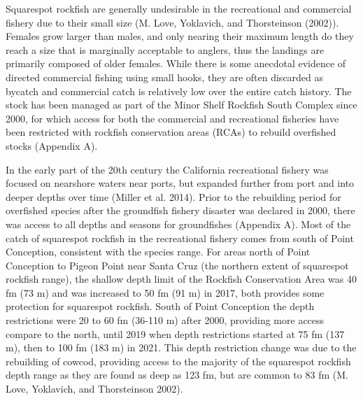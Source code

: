 \documentclass[11pt,
  english,
  a4paper,
]{article}
\begin{document}
\leavevmode\tagmcend\tagstructend


Squarespot rockfish are generally undesirable in the recreational and commercial fishery due to their small size ({M. Love, Yoklavich, and Thorsteinson (2002)\leavevmode\tagmcend\tagstructend}). Females grow larger than males, and only nearing their maximum length do they reach a size that is marginally acceptable to anglers, thus the landings are primarily composed of older females. While there is some anecdotal evidence of directed commercial fishing using small hooks, they are often discarded as bycatch and commercial catch is relatively low over the entire catch history. The stock has been managed as part of the Minor Shelf Rockfish South Complex since 2000, for which access for both the commercial and recreational fisheries have been restricted with rockfish conservation areas (RCAs) to rebuild overfished stocks (Appendix A).

\leavevmode\tagmcend\tagstructend\par


In the early part of the 20th century the California recreational fishery was focused on nearshore waters near ports, but expanded further from port and into deeper depths over time {(Miller et al. 2014)\leavevmode\tagmcend\tagstructend}. Prior to the rebuilding period for overfished species after the groundfish fishery disaster was declared in 2000, there was access to all depths and seasons for groundfishes (Appendix A). Most of the catch of squarespot rockfish in the recreational fishery comes from south of Point Conception, consistent with the species range. For areas north of Point Conception to Pigeon Point near Santa Cruz (the northern extent of squarespot rockfish range), the shallow depth limit of the Rockfish Conservation Area was 40 fm (73 m) and was increased to 50 fm (91 m) in 2017, both provides some protection for squarespot rockfish. South of Point Conception the depth restrictions were 20 to 60 fm (36-110 m) after 2000, providing more access compare to the north, until 2019 when depth restrictions started at 75 fm (137 m), then to 100 fm (183 m) in 2021. This depth restriction change was due to the rebuilding of cowcod, providing access to the majority of the squarespot rockfish depth range as they are found as deep as 123 fm, but are common to 83 fm {(M. Love, Yoklavich, and Thorsteinson 2002)\leavevmode\tagmcend\tagstructend}.
\end{document}
